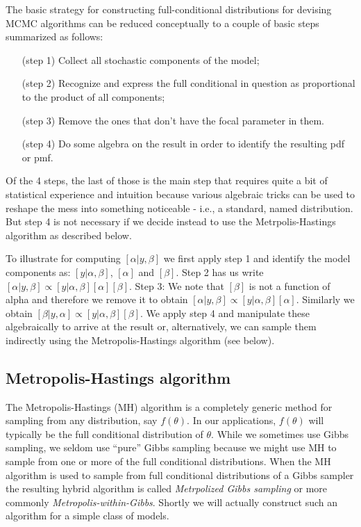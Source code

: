 The basic strategy for constructing full-conditional distributions for
devising MCMC algorithms can be reduced conceptually to a couple of
basic steps summarized as follows:
\begin{itemize}
\item[(step 1)] Collect all stochastic components of the model;
\item[(step 2)] Recognize and express the full conditional in question
  as proportional to the product of all components;
\item[(step 3)] Remove the ones that don't have the focal parameter in them.
\item[(step 4)] Do some algebra on the result in order to identify the resulting pdf or pmf.
\end{itemize}
Of the 4 steps, the last of those is the main step that requires quite
a bit of statistical experience and intuition because various
algebraic tricks can be used to reshape the mess into something
noticeable - i.e., a standard, named distribution. But step 4 is not
necessary if we decide instead to use the Metrpolis-Hastings algorithm
as described below.

To illustrate for computing $[\alpha|y,\beta]$ we first apply step 1
and identify the model components as: $[y|\alpha, \beta]$, $[\alpha]$
and $[\beta]$. Step 2 has us write $[\alpha|y,\beta] \propto
[y|\alpha,\beta][\alpha][\beta]$.  Step 3: We note that $[\beta]$ is not a
function of alpha and therefore we remove it to obtain $[\alpha|y,\beta]
\propto [y|\alpha,\beta][\alpha]$. Similarly we obtain $[\beta|y,\alpha]
\propto [y|\alpha,\beta][\beta]$. We apply step 4 and manipulate
these algebraically to arrive at the result or, alternatively, we can
sample them indirectly using the Metropolis-Hastings algorithm (see
below).


\subsection{Metropolis-Hastings algorithm}

The Metropolis-Hastings (MH) algorithm is a completely generic method for
sampling from any distribution, say $f(\theta)$. In our applications,
$f(\theta)$ will typically be the full conditional distribution of
$\theta$.
While we sometimes use Gibbs sampling, we seldom
use ``pure'' Gibbs sampling because we might use MH to sample from one
or more of the full conditional distributions.
When the MH algorithm is used to sample from  full
conditional distributions of a Gibbs sampler the resulting hybrid algorithm is
called
 {\it Metrpolized Gibbs sampling} or
more commonly {\it Metropolis-within-Gibbs}.
Shortly we will
actually construct such an algorithm for a simple class of models.


